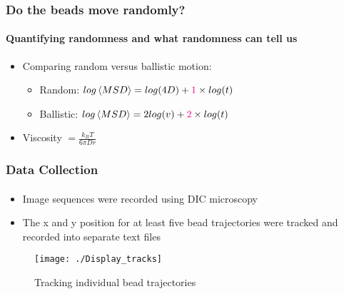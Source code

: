 \documentclass[mathserif]{beamer}
\begin{document}
  \begin{frame}
       \frametitle{Do the beads move randomly?}
       \framesubtitle{Quantifying randomness and what randomness can tell us}
       \begin{itemize}
	   \item Comparing random versus ballistic motion:
       	  \begin{itemize}
       	  \item Random: $log\left<MSD\right> = log(4D) + {\color{magenta}1}\times log(t)$
       	  \item Ballistic: $log\left<MSD\right> = 2log(v) + {\color{magenta}2}\times log(t)$
       	  \end{itemize}
       \end{itemize}
       \vspace{1mm}
       \begin{itemize}
       \item Viscosity $ = \frac{k_B T}{6\pi D r}$
       \end{itemize}
     \end{frame}
  
 \begin{frame}
    \frametitle{Data Collection}
    \framesubtitle{}
    \begin{itemize}
    \item Image sequences were recorded using DIC microscopy
    \item The x and y position for at least five bead trajectories were tracked and recorded into separate text files
	\end{itemize}
	\begin{figure}
		\centering
		\texttt{[image: ./Display\_tracks]}
		\caption{Tracking individual bead trajectories}
		\label{fig:Tracking_target}
	\end{figure}
  \end{frame}  
    
\end{document}

